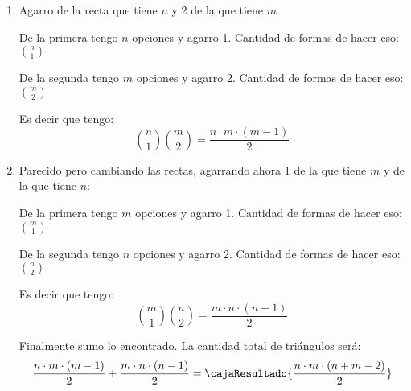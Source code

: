 \begin{enumerate}[label=(\Roman*)]
  \item
        Agarro  de la recta que tiene $n$ y {\color{red!80!black}2} de la que tiene $m$.
        \begin{center}
          De la primera tengo $n$ opciones y agarro 1. Cantidad de formas de hacer eso: $\binom{n}{1}$

          De la segunda tengo $m$ opciones y agarro 2. Cantidad de formas de hacer eso: $\binom{m}{2}$
        \end{center}

        Es decir que tengo:
        $$
          \binom{n}{1}
          \binom{m}{2}
          = \frac{n \cdot m \cdot (m - 1)}{2}
        $$

  \item
        Parecido pero cambiando las rectas, agarrando ahora {\color{red!80!black}1} de la que tiene $m$ y
         de la que tiene $n$:
        \begin{center}
          De la primera tengo $m$ opciones y agarro 1. Cantidad de formas de hacer eso: $\binom{m}{1}$

          De la segunda tengo $n$ opciones y agarro 2. Cantidad de formas de hacer eso: $\binom{n}{2}$
        \end{center}

        Es decir que tengo:
        $$
          \binom{m}{1}
          \binom{n}{2}
          = \frac{m \cdot n \cdot (n - 1)}{2}
        $$

        \bigskip

        Finalmente sumo lo encontrado. La cantidad total de triángulos será:
        $$
          \frac{n \cdot m \cdot (m - 1)}{2}
          +
          \frac{m \cdot n \cdot (n - 1)}{2}
          =
          \cajaResultado{
            \frac{n \cdot m \cdot (n + m - 2)}{2}
          }
        $$
\end{enumerate}

\begin{aportes}
  \item {}
  \item {}
\end{aportes}

